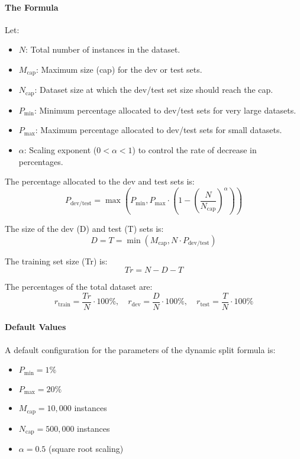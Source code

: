 \documentclass[12pt,openany]{book}
\begin{document}
\paragraph{The Formula}
Let:
\begin{itemize}
    \item \(N\): Total number of instances in the dataset.
    \item \(M_{\text{cap}}\): Maximum size (cap) for the dev or test sets.
    \item \(N_{\text{cap}}\): Dataset size at which the dev/test set size should reach the cap.
    \item \(P_{\text{min}}\): Minimum percentage allocated to dev/test sets for very large datasets.
    \item \(P_{\text{max}}\): Maximum percentage allocated to dev/test sets for small datasets.
    \item \(\alpha\): Scaling exponent (\(0 < \alpha < 1\)) to control the rate of decrease in percentages.
\end{itemize} 

\vspace{2em}

The percentage allocated to the dev and test sets is:
\[
P_{\text{dev/test}} = \max\left(P_{\text{min}}, P_{\text{max}} \cdot \left(1 - \left(\frac{N}{N_{\text{cap}}}\right)^\alpha\right)\right)
\]

The size of the dev (D) and test (T) sets is:
\[
D = T = \min(M_{\text{cap}}, N \cdot P_{\text{dev/test}})
\]

The training set size (Tr) is:
\[
Tr = N - D - T
\]

The percentages of the total dataset are:
\[
r_{\text{train}} = \frac{Tr}{N} \cdot 100\%, \quad r_{\text{dev}} = \frac{D}{N} \cdot 100\%, \quad r_{\text{test}} = \frac{T}{N} \cdot 100\%
\]

\paragraph{Default Values}
A default configuration for the parameters of the dynamic split formula is:
\begin{itemize}
    \item \(P_{\text{min}} = 1\%\)
    \item \(P_{\text{max}} = 20\%\)
    \item \(M_{\text{cap}} = 10,000\) instances
    \item \(N_{\text{cap}} = 500,000\) instances
    \item \(\alpha = 0.5\) (square root scaling)
\end{itemize}
\end{document}
